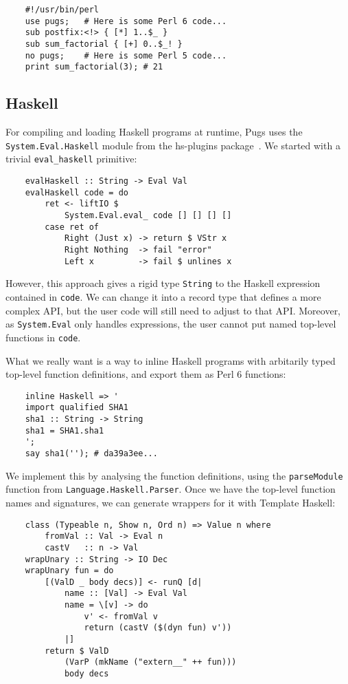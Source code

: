 \documentclass[]{sigplanconf}
\newcommand{\code}[1]{\texttt{#1}}
\begin{document}
\begin{lstlisting}
    #!/usr/bin/perl
    use pugs;   # Here is some Perl 6 code...
    sub postfix:<!> { [*] 1..$_ }
    sub sum_factorial { [+] 0..$_! }
    no pugs;    # Here is some Perl 5 code...
    print sum_factorial(3); # 21
\end{lstlisting}

\subsection{Haskell}
\label{sec:Haskell}

For compiling and loading Haskell programs at runtime, Pugs uses the
\code{System.Eval.Haskell} module from the hs-plugins package~\cite{Pang}.  We
started with a trivial \code{eval\_haskell} primitive:

\begin{lstlisting}
    evalHaskell :: String -> Eval Val
    evalHaskell code = do
        ret <- liftIO $
            System.Eval.eval_ code [] [] [] []
        case ret of
            Right (Just x) -> return $ VStr x
            Right Nothing  -> fail "error"
            Left x         -> fail $ unlines x
\end{lstlisting}

However, this approach gives a rigid type \code{String} to the Haskell
expression contained in \code{code}.  We can change it into a record type that
defines a more complex API, but the user code will still need to adjust to that
API.  Moreover, as \texttt{System.Eval} only handles expressions, the user cannot
put named top-level functions in \code{code}.

What we really want is a way to inline Haskell programs with arbitarily typed
top-level function definitions, and export them as Perl 6 functions:

\begin{lstlisting}
    inline Haskell => '
    import qualified SHA1
    sha1 :: String -> String
    sha1 = SHA1.sha1
    ';
    say sha1(''); # da39a3ee...
\end{lstlisting}

We implement this by analysing the function definitions, using the
\code{parseModule} function from \texttt{Language.Haskell.Parser}.  Once we
have the top-level function names and signatures, we can generate wrappers for
it with Template Haskell:

\begin{lstlisting}
    class (Typeable n, Show n, Ord n) => Value n where
        fromVal :: Val -> Eval n
        castV   :: n -> Val
    wrapUnary :: String -> IO Dec
    wrapUnary fun = do
        [(ValD _ body decs)] <- runQ [d|
            name :: [Val] -> Eval Val
            name = \[v] -> do
                v' <- fromVal v
                return (castV ($(dyn fun) v'))
            |]
        return $ ValD
            (VarP (mkName ("extern__" ++ fun)))
            body decs
\end{lstlisting}
\end{document}
